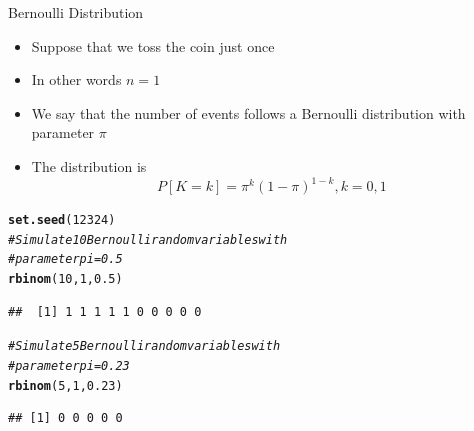 \documentclass[xcolor=x11names,compress]{beamer}\usepackage[]{graphicx}\usepackage[]{color}
\makeatletter
\newcommand{\hlnum}[1]{\textcolor[rgb]{0.686,0.059,0.569}{#1}}%
\newcommand{\hlcom}[1]{\textcolor[rgb]{0.678,0.584,0.686}{\textit{#1}}}%
\newcommand{\hlstd}[1]{\textcolor[rgb]{0.345,0.345,0.345}{#1}}%
\newcommand{\hlkwd}[1]{\textcolor[rgb]{0.737,0.353,0.396}{\textbf{#1}}}%
\newenvironment{kframe}{%
 \def\at@end@of@kframe{}%
 \ifinner\ifhmode%
  \def\at@end@of@kframe{\end{minipage}}%
  \begin{minipage}{\columnwidth}%
 \fi\fi%
 \def\FrameCommand##1{\hskip\@totalleftmargin \hskip-\fboxsep
 \colorbox{shadecolor}{##1}\hskip-\fboxsep
     \hskip-\linewidth \hskip-\@totalleftmargin \hskip\columnwidth}%
 \MakeFramed {\advance\hsize-\width
   \@totalleftmargin\z@ \linewidth\hsize
   \@setminipage}}%
 {\par\unskip\endMakeFramed%
 \at@end@of@kframe}
\newenvironment{knitrout}{}{} %
\makeatother
\begin{document}
\begin{frame}[fragile]{Bernoulli Distribution}
  \begin{itemize}
  \item Suppose that we toss the coin just once
  \item In other words $n=1$
  \item We say that the number of events follows  a Bernoulli distribution with
        parameter $\pi$
  \item The distribution is
    \begin{equation*}
      P[K=k] = \pi^k (1-\pi)^{1-k}, k=0,1
    \end{equation*}
  \end{itemize}
\begin{knitrout}\tiny
{}\color{fgcolor}\begin{kframe}
\begin{alltt}
\hlkwd{set.seed}\hlstd{(}\hlnum{12324}\hlstd{)}
\hlcom{# Simulate 10 Bernoulli random variables with}
\hlcom{# parameter pi=0.5}
\hlkwd{rbinom}\hlstd{(}\hlnum{10}\hlstd{,}\hlnum{1}\hlstd{,}\hlnum{0.5}\hlstd{)}
\end{alltt}
\begin{verbatim}
##  [1] 1 1 1 1 1 0 0 0 0 0
\end{verbatim}
\begin{alltt}
\hlcom{# Simulate 5 Bernoulli random variables with}
\hlcom{# parameter pi=0.23}
\hlkwd{rbinom}\hlstd{(}\hlnum{5}\hlstd{,}\hlnum{1}\hlstd{,}\hlnum{0.23}\hlstd{)}
\end{alltt}
\begin{verbatim}
## [1] 0 0 0 0 0
\end{verbatim}
\end{kframe}
\end{knitrout}
\end{frame}
\end{document}
